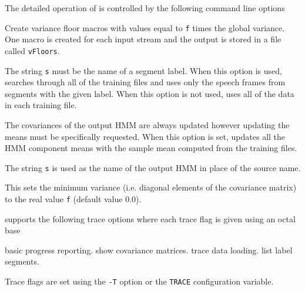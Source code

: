 The detailed operation of  is controlled by the following
command line options
\begin{optlist}
   Create variance floor macros with values equal to 
     \texttt{f} times the global variance.  One macro is created for
     each input stream and the output is stored in a file 
     called \texttt{vFloors}. 

   The string {\tt s} must be the name of a
      segment label.  When this option is used,  searches
      through all of the training files and uses only the speech
      frames from segments with the given label.  When this option is not 
      used,  uses
      all of the data in each training file.

   The covariances of the output HMM are always updated
    however updating the means must be specifically requested. When 
    this option is set,  updates all the HMM component 
    means with the sample mean computed from the training files. 

    The string {\tt s} is used as the name of the output
      HMM in place of the source name.

    This sets the minimum variance (i.e. diagonal elements of
      the covariance matrix) to the real value {\tt f} (default value
      0.0).

\stdoptB
\stdoptF
\stdoptG
\stdoptH
\stdoptI
\stdoptL
\stdoptM
\stdoptX

\end{optlist}


 supports the following trace options where each
trace flag is given using an octal base
\begin{optlist}
    basic progress reporting.
    show covariance matrices.
    trace data loading.
    list label segments.
\end{optlist}
Trace flags are set using the \texttt{-T} option or the  \texttt{TRACE} 
configuration variable.


